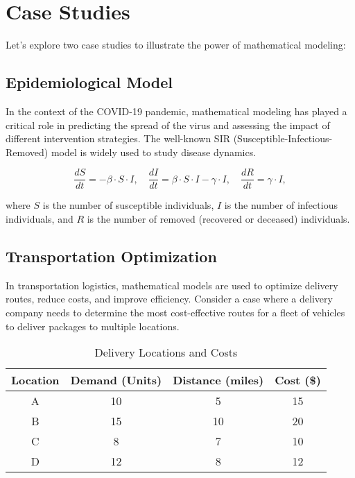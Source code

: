 \documentclass{article}
\begin{document}
\section{Case Studies}

Let's explore two case studies to illustrate the power of mathematical modeling:

\subsection{Epidemiological Model}

In the context of the COVID-19 pandemic, mathematical modeling has played a critical role in predicting the spread of the virus and assessing the impact of different intervention strategies. The well-known SIR (Susceptible-Infectious-Removed) model is widely used to study disease dynamics.

\begin{equation}
\frac{dS}{dt} = -\beta \cdot S \cdot I, \quad \frac{dI}{dt} = \beta \cdot S \cdot I - \gamma \cdot I, \quad \frac{dR}{dt} = \gamma \cdot I,
\end{equation}

where $S$ is the number of susceptible individuals, $I$ is the number of infectious individuals, and $R$ is the number of removed (recovered or deceased) individuals.

\subsection{Transportation Optimization}

In transportation logistics, mathematical models are used to optimize delivery routes, reduce costs, and improve efficiency. Consider a case where a delivery company needs to determine the most cost-effective routes for a fleet of vehicles to deliver packages to multiple locations.

\begin{table}[H]
\centering
\begin{tabular}{|c|c|c|c|}
\hline
\textbf{Location} & \textbf{Demand (Units)} & \textbf{Distance (miles)} & \textbf{Cost (\$)} \\ \hline
A & 10 & 5 & 15 \\ \hline
B & 15 & 10 & 20 \\ \hline
C & 8 & 7 & 10 \\ \hline
D & 12 & 8 & 12 \\ \hline
\end{tabular}
\caption{Delivery Locations and Costs}
\end{table}
\end{document}
